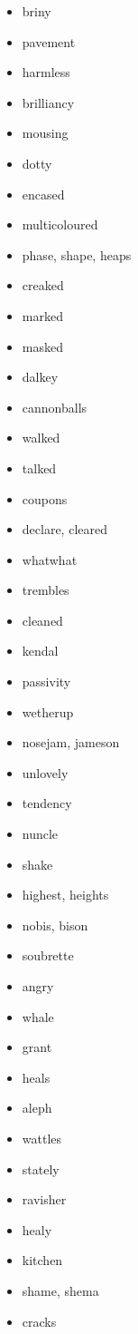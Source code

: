 \documentclass{article}
\begin{document}
\begin{itemize}
    \item briny
    \item pavement
    \item harmless
    \item brilliancy
    \item mousing
    \item dotty
    \item encased
    \item multicoloured
    \item phase, shape, heaps
    \item creaked
    \item marked
    \item masked
    \item dalkey
    \item cannonballs
    \item walked
    \item talked
    \item coupons
    \item declare, cleared
    \item whatwhat
    \item trembles
    \item cleaned
    \item kendal
    \item passivity
    \item wetherup
    \item nosejam, jameson
    \item unlovely
    \item tendency
    \item nuncle
    \item shake
    \item highest, heights
    \item nobis, bison
    \item soubrette
    \item angry
    \item whale
    \item grant
    \item heals
    \item aleph
    \item wattles
    \item stately
    \item ravisher
    \item healy
    \item kitchen
    \item shame, shema
    \item cracks

\end{itemize}
\end{document}
